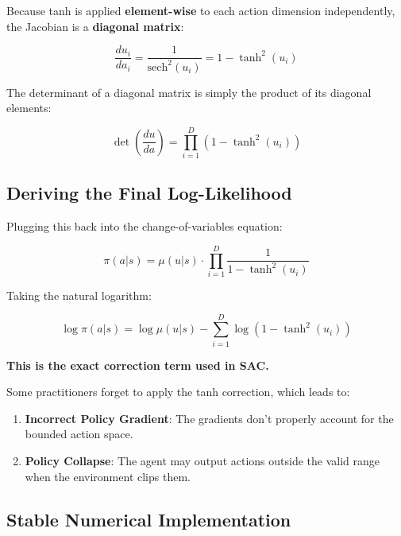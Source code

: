 \documentclass[12pt,a4paper]{article}
\theoremstyle{noteplain}
\theoremstyle{noteexercise}
\begin{document}
Because tanh is applied \textbf{element-wise} to each action dimension independently, the Jacobian is a \textbf{diagonal matrix}:

$$\frac{du_i}{da_i} = \frac{1}{\text{sech}^2(u_i)} = 1 - \tanh^2(u_i)$$

The determinant of a diagonal matrix is simply the product of its diagonal elements:

$$\det\left(\frac{du}{da}\right) = \prod_{i=1}^{D} \left(1 - \tanh^2(u_i)\right)$$



\subsection{Deriving the Final Log-Likelihood}\label{ssec:log-likelihood}



Plugging this back into the change-of-variables equation:

$$\pi(a|s) = \mu(u|s) \cdot \prod_{i=1}^{D} \frac{1}{1 - \tanh^2(u_i)}$$

Taking the natural logarithm:

\begin{equation}\label{eq:tanh-correction}
\boxed{\log\pi(a|s) = \log\mu(u|s) - \sum_{i=1}^{D} \log\left(1 - \tanh^2(u_i)\right)}
\end{equation}

\textbf{This is the exact correction term used in SAC.}
\begin{keypoint}

Some practitioners forget to apply the tanh correction, which leads to:

\begin{enumerate}
  \item \textbf{Incorrect Policy Gradient}: The gradients don't properly account for the bounded action space.
  \item \textbf{Policy Collapse}: The agent may output actions outside the valid range when the environment clips them.
\end{enumerate}

\end{keypoint}



\subsection{Stable Numerical Implementation}\label{ssec:stable-num}
\end{document}
